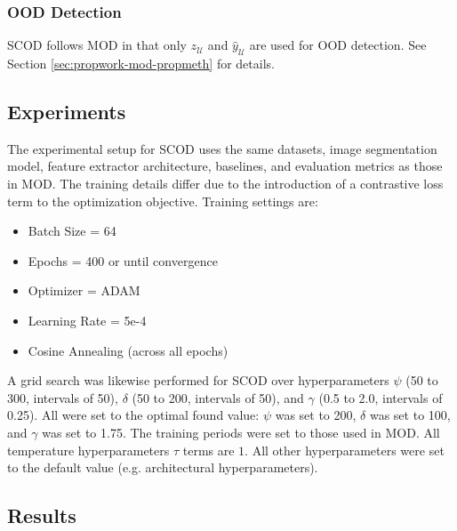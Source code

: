 \subsubsection{OOD Detection}
SCOD follows MOD in that only $z_{\mathcal{U}}$ and $\hat{y}_{\mathcal{U}}$ are used for OOD detection. See Section \ref{sec:propwork-mod-propmeth} for details.

\subsection{Experiments}
\label{sec:propwork-scod-exp}

The experimental setup for SCOD uses the same datasets, image segmentation model, feature extractor architecture, baselines, and evaluation metrics as those in MOD. The training details differ due to the introduction of a contrastive loss term to the optimization objective. Training settings are:
\begin{itemize}
    \item Batch Size = 64
    \item Epochs = 400 or until convergence
    \item Optimizer = ADAM \cite{zhang2018improved}
    \item Learning Rate = 5e-4
    \item Cosine Annealing (across all epochs)
\end{itemize}
A grid search was likewise performed for SCOD over hyperparameters $\psi$ (50 to 300, intervals of 50), $\delta$ (50 to 200, intervals of 50), and $\gamma$ (0.5 to 2.0, intervals of 0.25). All were set to the optimal found value: $\psi$ was set to 200, $\delta$ was set to 100, and $\gamma$ was set to 1.75. The training periods were set to those used in MOD. All temperature hyperparameters $\tau$ terms are $1$. All other hyperparameters were set to the default value (e.g. architectural hyperparameters).

\subsection{Results}
\label{sec:propwork-scod-results}

